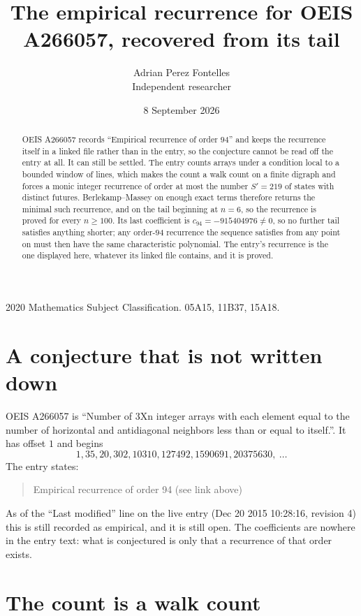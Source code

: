 \documentclass[11pt,a4paper]{article}
\title{The empirical recurrence for OEIS A266057, recovered from its tail}
\author{Adrian Perez Fontelles\\ \small Independent researcher}
\date{8 September 2026}
\theoremstyle{plain}
\theoremstyle{definition}
\begin{document}
\maketitle

\begin{abstract}
OEIS A266057 records ``Empirical recurrence of order $94$'' and keeps the recurrence itself in
a linked file rather than in the entry, so the conjecture cannot be read off the entry at all.
It can still be settled. The entry counts arrays under a condition local to a bounded window of
lines, which makes the count a walk count on a finite digraph and forces a monic integer
recurrence of order at most the number $S'=219$ of states with distinct futures. Berlekamp--Massey on
enough exact terms therefore returns the minimal such recurrence, and on the tail beginning at $n=6$, so the recurrence is proved for every $n\ge100$.
Its last coefficient is $c_{94}=-915404976\neq0$, so no further tail satisfies anything
shorter; any order-$94$ recurrence the sequence satisfies from any point on must then have
the same characteristic polynomial. The entry's recurrence is the one displayed here, whatever
its linked file contains, and it is proved.
\end{abstract}

\noindent\small 2020 Mathematics Subject Classification. 05A15, 11B37, 15A18.\normalsize

\section{A conjecture that is not written down}

OEIS A266057 is ``Number of 3Xn integer arrays with each element equal to the number of horizontal and antidiagonal neighbors less than or equal to itself.''. It has offset $1$ and begins
\[
1, 35, 20, 302, 10310, 127492, 1590691, 20375630,\ \dots
\]
The entry states:
\begin{quote}
Empirical recurrence of order 94 (see link above)
\end{quote}
As of the ``Last modified'' line on the live entry (Dec 20 2015 10:28:16, revision 4)
this is still recorded as empirical, and it is still open. The coefficients are nowhere in the
entry text: what is conjectured is only that a recurrence of that order exists.

\section{The count is a walk count}
\end{document}
